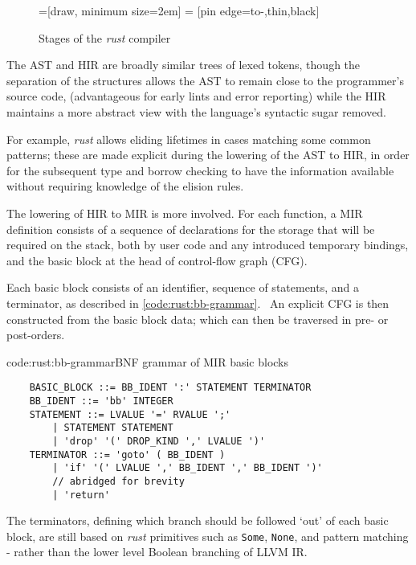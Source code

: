 \begin{figure}[!h]
    \centering
    =[draw, minimum size=2em]
     = [pin edge={to-,thin,black}]
    \caption{Stages of the \emph{rust} compiler}
    \label{fig:rust:compiler-stages}
\end{figure}

The AST and HIR are broadly similar trees of lexed tokens, though the separation of the structures allows the AST to remain close to the programmer's source code, (advantageous for early lints and error reporting) while the HIR maintains a more abstract view with the language's syntactic sugar removed.

For example, \emph{rust} allows eliding lifetimes in cases matching some common patterns; these are made explicit during the lowering of the AST to HIR, in order for the subsequent type and borrow checking to have the information available without requiring knowledge of the elision rules. \cite{rust_rfc1191}

The lowering of HIR to MIR is more involved. For each function, a MIR definition consists of a sequence of declarations for the storage that will be required on the stack, both by user code and any introduced temporary bindings, and the basic block at the head of control-flow graph (CFG).

Each basic block consists of an identifier, sequence of statements, and a terminator, as described in \cref{code:rust:bb-grammar}.~\cite{rust_rfc1211} An explicit CFG is then constructed from the basic block data; which can then be traversed in pre- or post-orders.

\begin{codelisting}{code:rust:bb-grammar}{BNF grammar of MIR basic blocks}
\begin{verbatim}
    BASIC_BLOCK ::= BB_IDENT ':' STATEMENT TERMINATOR
    BB_IDENT ::= 'bb' INTEGER
    STATEMENT ::= LVALUE '=' RVALUE ';'
        | STATEMENT STATEMENT
        | 'drop' '(' DROP_KIND ',' LVALUE ')'
    TERMINATOR ::= 'goto' ( BB_IDENT )
        | 'if' '(' LVALUE ',' BB_IDENT ',' BB_IDENT ')'
        // abridged for brevity
        | 'return'
\end{verbatim}
\end{codelisting}

The terminators, defining which branch should be followed `out' of each basic block, are still based on \emph{rust} primitives such as \texttt{Some}, \texttt{None}, and pattern matching - rather than the lower level Boolean branching of LLVM IR. \cite{rust_intro_mir}
